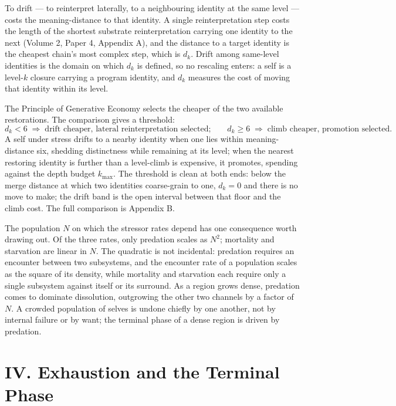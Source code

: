 \documentclass[11pt,oneside]{report}
\theoremstyle{definition}
\theoremstyle{remark}
\begin{document}
To drift --- to reinterpret laterally, to a neighbouring identity at the same level --- costs the meaning-distance to that identity. A single reinterpretation step costs the length of the shortest substrate reinterpretation carrying one identity to the next (Volume 2, Paper 4, Appendix A), and the distance to a target identity is the cheapest chain's most complex step, which is \ensuremath{d_k}. Drift among same-level identities is the domain on which \ensuremath{d_k} is defined, so no rescaling enters: a self is a level-\ensuremath{k} closure carrying a program identity, and \ensuremath{d_k} measures the cost of moving that identity within its level.

The Principle of Generative Economy selects the cheaper of the two available restorations. The comparison gives a threshold:
\[
d_k < 6 \;\Rightarrow\; \text{drift cheaper, lateral reinterpretation selected;} \qquad
d_k \ge 6 \;\Rightarrow\; \text{climb cheaper, promotion selected.}
\]
A self under stress drifts to a nearby identity when one lies within meaning-distance six, shedding distinctness while remaining at its level; when the nearest restoring identity is further than a level-climb is expensive, it promotes, spending against the depth budget \ensuremath{k_{\max}}. The threshold is clean at both ends: below the merge distance at which two identities coarse-grain to one, \ensuremath{d_k = 0} and there is no move to make; the drift band is the open interval between that floor and the climb cost. The full comparison is Appendix B.

The population \ensuremath{N} on which the stressor rates depend has one consequence worth drawing out. Of the three rates, only predation scales as \ensuremath{N^2}; mortality and starvation are linear in \ensuremath{N}. The quadratic is not incidental: predation requires an encounter between two subsystems, and the encounter rate of a population scales as the square of its density, while mortality and starvation each require only a single subsystem against itself or its surround. As a region grows dense, predation comes to dominate dissolution, outgrowing the other two channels by a factor of \ensuremath{N}. A crowded population of selves is undone chiefly by one another, not by internal failure or by want; the terminal phase of a dense region is driven by predation.

\section*{IV. Exhaustion and the Terminal Phase}
\end{document}
